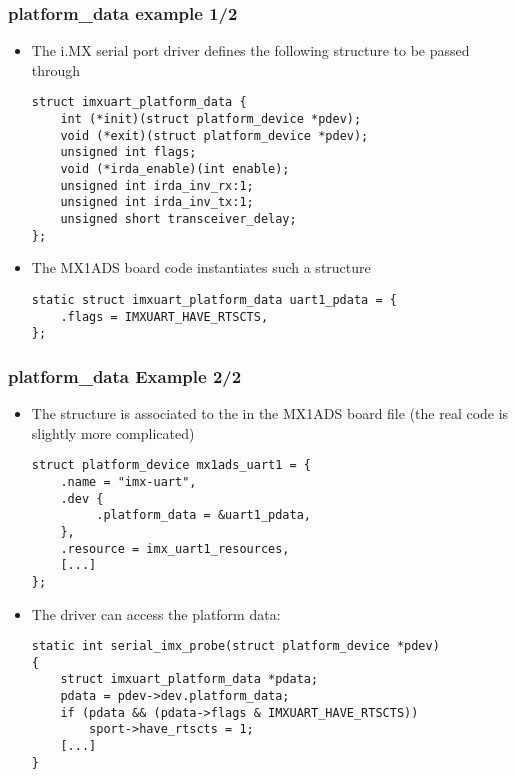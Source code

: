 \begin{frame}[fragile]
  \frametitle{platform\_data example 1/2}
  \begin{itemize}
  \item The i.MX serial port driver defines the following structure to
    be passed through 

  \begin{verbatim}
struct imxuart_platform_data {
    int (*init)(struct platform_device *pdev);
    void (*exit)(struct platform_device *pdev);
    unsigned int flags;
    void (*irda_enable)(int enable);
    unsigned int irda_inv_rx:1;
    unsigned int irda_inv_tx:1;
    unsigned short transceiver_delay;
};
  \end{verbatim}
  \item The MX1ADS board code instantiates such a structure
  \begin{verbatim}
static struct imxuart_platform_data uart1_pdata = {
    .flags = IMXUART_HAVE_RTSCTS,
};
  \end{verbatim}
  \end{itemize}
\end{frame}

\begin{frame}[fragile]
  \frametitle{platform\_data Example 2/2}
  \begin{itemize}
  \item The  structure is associated to the
     in the MX1ADS board file (the real code is
    slightly more complicated)
  \begin{verbatim}
struct platform_device mx1ads_uart1 = {
    .name = "imx-uart",
    .dev {
         .platform_data = &uart1_pdata,
    },
    .resource = imx_uart1_resources,
    [...]
};
  \end{verbatim}
  \item The driver can access the platform data:
  \begin{verbatim}
static int serial_imx_probe(struct platform_device *pdev)
{
    struct imxuart_platform_data *pdata;
    pdata = pdev->dev.platform_data;
    if (pdata && (pdata->flags & IMXUART_HAVE_RTSCTS))
        sport->have_rtscts = 1;
    [...]
}
  \end{verbatim}
\end{itemize}
\end{frame}

